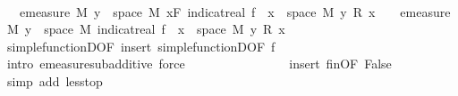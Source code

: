 \begin{isabellebody}
\ \ \ \ \ \ \ \ \isamarkupfalse%
\ \isamarkupfalse%
\ {\isachardoublequoteopen}{\isachardot}{\kern0pt}{\isachardot}{\kern0pt}{\isachardot}{\kern0pt}\ {\isasymle}\ emeasure\ M\ {\isacharbraceleft}{\kern0pt}y\ {\isasymin}\ space\ M{\isachardot}{\kern0pt}\ {\isacharparenleft}{\kern0pt}{\isasymSum}x{\isasymin}F{\isachardot}{\kern0pt}\ indicat{\isacharunderscore}{\kern0pt}real\ {\isacharparenleft}{\kern0pt}f\ {\isacharminus}{\kern0pt}{\isacharbackquote}{\kern0pt}\ {\isacharbraceleft}{\kern0pt}x{\isacharbraceright}{\kern0pt}\ {\isasyminter}\ space\ M{\isacharparenright}{\kern0pt}\ y\ {\isacharasterisk}{\kern0pt}\isactrlsub R\ x{\isacharparenright}{\kern0pt}\ {\isasymnoteq}\ {}{\isacharbraceright}{\kern0pt}\ {\isacharplus}{\kern0pt}\ emeasure\ M\ {\isacharbraceleft}{\kern0pt}y\ {\isasymin}\ space\ M{\isachardot}{\kern0pt}\ indicat{\isacharunderscore}{\kern0pt}real\ {\isacharparenleft}{\kern0pt}f\ {\isacharminus}{\kern0pt}{\isacharbackquote}{\kern0pt}\ {\isacharbraceleft}{\kern0pt}x{\isacharbraceright}{\kern0pt}\ {\isasyminter}\ space\ M{\isacharparenright}{\kern0pt}\ y\ {\isacharasterisk}{\kern0pt}\isactrlsub R\ x\ {\isasymnoteq}\ {}{\isacharbraceright}{\kern0pt}{\isachardoublequoteclose}\isanewline
\ \ \ \ \ \ \ \ \ \ \isamarkupfalse%
\ simple{\isacharunderscore}{\kern0pt}functionD{\isacharparenleft}{\kern0pt}{}{\isacharparenright}{\kern0pt}{\isacharbrackleft}{\kern0pt}OF\ insert{\isacharparenleft}{\kern0pt}{}{\isacharparenright}{\kern0pt}{\isacharbrackright}{\kern0pt}\ simple{\isacharunderscore}{\kern0pt}functionD{\isacharparenleft}{\kern0pt}{}{\isacharparenright}{\kern0pt}{\isacharbrackleft}{\kern0pt}OF\ f{\isacharparenleft}{\kern0pt}{}{\isacharparenright}{\kern0pt}{\isacharbrackright}{\kern0pt}\ \isamarkupfalse%
\ {\isacharparenleft}{\kern0pt}intro\ emeasure{\isacharunderscore}{\kern0pt}subadditive{\isacharcomma}{\kern0pt}\ force{\isacharplus}{\kern0pt}{\isacharparenright}{\kern0pt}\isanewline
\ \ \ \ \ \ \ \ \isamarkupfalse%
\ \isamarkupfalse%
\ {\isachardoublequoteopen}{\isachardot}{\kern0pt}{\isachardot}{\kern0pt}{\isachardot}{\kern0pt}\ {\isacharless}{\kern0pt}\ {\isasyminfinity}{\isachardoublequoteclose}\ \isamarkupfalse%
\ insert{\isacharparenleft}{\kern0pt}{}{\isacharparenright}{\kern0pt}\ fin{\isacharunderscore}{\kern0pt}{}{\isacharbrackleft}{\kern0pt}OF\ False{\isacharbrackright}{\kern0pt}\ \isamarkupfalse%
\ {\isacharparenleft}{\kern0pt}simp\ add{\isacharcolon}{\kern0pt}\ less{\isacharunderscore}{\kern0pt}top{\isacharparenright}{\kern0pt}\isanewline

\end{isabellebody}
